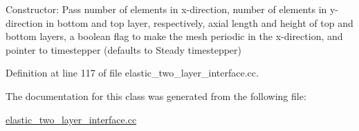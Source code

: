 Constructor\+: Pass number of elements in x-\/direction, number of elements in y-\/direction in bottom and top layer, respectively, axial length and height of top and bottom layers, a boolean flag to make the mesh periodic in the x-\/direction, and pointer to timestepper (defaults to Steady timestepper) 



Definition at line 117 of file elastic\+\_\+two\+\_\+layer\+\_\+interface.\+cc.



The documentation for this class was generated from the following file\+:\begin{DoxyCompactItemize}
\item 
\hyperlink{elastic__two__layer__interface_8cc}{elastic\+\_\+two\+\_\+layer\+\_\+interface.\+cc}\end{DoxyCompactItemize}
